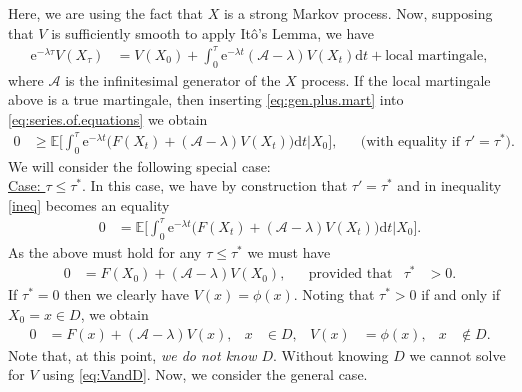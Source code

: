 \documentclass[12pt]{book}
\let\varphi\phi
\numberwithin{equation}{chapter}
\theoremstyle{plain}
\numberwithin{theorem}{section}
\theoremstyle{definition}
\numberwithin{exercise}{chapter}
\newcommand{\<}{\langle}
\renewcommand{\>}{\rangle}
\renewcommand{\(}{\left(}
\renewcommand{\)}{\right)}
\renewcommand{\[}{\left[}
\renewcommand{\]}{\right]}
\newcommand\Eb{\mathds{E}}
\newcommand\Ac{\mathscr{A}}
\newcommand\Fc{\mathscr{F}}
\newcommand\sig{\sigma}
\newcommand\lam{\lambda}
\newcommand\dd{\mathrm{d}}
\newcommand\ee{\mathrm{e}}
\begin{document}
Here, we are using the fact that $X$ is a strong Markov process.
Now, supposing that $V$ is sufficiently smooth to apply It\^o's Lemma, we have
\begin{align}
\ee^{- \lam \tau } V(X_\tau )
	&=	V(X_0) + \int_0^\tau \ee^{-\lam t} (\Ac - \lam ) V(X_t) \dd t + \text{local martingale} , \label{eq:gen.plus.mart}
\end{align}
where $\Ac$ is the infinitesimal generator of the $X$ process.  If the local martingale above is a true martingale, then inserting \eqref{eq:gen.plus.mart} into \eqref{eq:series.of.equations} we obtain
\begin{align}
0
	&\geq \Eb \Big[ \int_0^\tau \ee^{-\lam t} \Big( F(X_t) + (\Ac - \lam ) V(X_t) \Big) \dd t \Big| X_0 \Big] , &
	&\text{(with equality if $\tau' = \tau^*$).} \label{ineq}
\end{align}
We will consider the following special case:
\\[0.5em]
\underline{Case: $\tau \leq \tau^*$}.  In this case, we have by construction that $\tau' = \tau^*$ and in inequality \eqref{ineq} becomes an equality
\begin{align}
0
	&=\Eb \Big[ \int_0^\tau \ee^{-\lam t} \Big( F(X_t) + (\Ac - \lam ) V(X_t) \Big) \dd t \Big| X_0 \Big] .
\end{align}
As the above must hold for any $\tau \leq \tau^*$ we must have
\begin{align}
0
	&=	F(X_0) + (\Ac - \lam ) V(X_0) , &
	&\text{provided that}&
\tau^*
	&> 0 .
\end{align}
If $\tau^* = 0$ then we clearly have $V(x) = \varphi(x)$.  Noting that $\tau^* > 0$ if and only if $X_0 = x \in D$, we obtain
\begin{align}
0
	&=	F(x) + (\Ac - \lam ) V(x) , &
x
	&\in D , &
V(x)
	&=	\varphi(x) , &
x
	&\notin D . \label{eq:VandD}
\end{align}
Note that, at this point, \emph{we do not know $D$}.  Without knowing $D$ we cannot solve for $V$ using \eqref{eq:VandD}.
Now, we consider the general case.
\\[0.5em]
\end{document}

